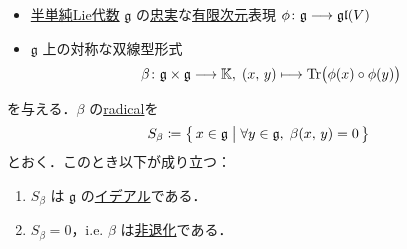 \documentclass[rep_main]{subfiles}
\begin{document}

\begin{mylem}[label=lem:nondegenerate]{}
	\begin{itemize}
		\item \hyperref[def:semisimple-LieAlg]{半単純Lie代数} $\mathfrak{g}$ の\hyperref[def:faithful]{忠実}な\underline{有限次元}表現 $\phi \colon \mathfrak{g} \longrightarrow \mathfrak{gl} (V)$ 
		\item $\mathfrak{g}$ 上の対称な双線型形式
		\begin{align}
			\beta \colon \mathfrak{g} \times \mathfrak{g} \longrightarrow \mathbb{K},\; (x,\, y) \longmapsto \Tr \bigl( \phi(x) \circ \phi(y) \bigr) 
		\end{align}
	\end{itemize}
	を与える．$\beta$ の\hyperref[def:radical-bilinear]{radical}を
	\begin{align}
		S_\beta \coloneqq \bigl\{\, x \in \mathfrak{g} \bigm| \forall y \in \mathfrak{g},\; \beta (x,\, y) = 0 \,\bigr\} 
	\end{align}
	とおく．このとき以下が成り立つ：
	\begin{enumerate}
		\item $S_\beta$ は $\mathfrak{g}$ の\hyperref[def:ideal-LieAlg]{イデアル}である．
		\item $S_\beta = 0$，i.e. $\beta$ は\hyperref[def:radical-bilinear]{非退化}である．
	\end{enumerate}
\end{mylem}
\end{document}
